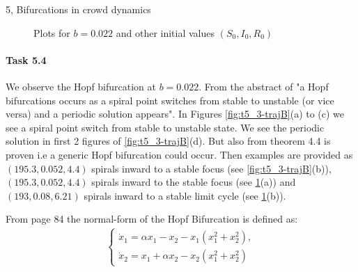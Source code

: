\begin{task}{5, Bifurcations in crowd dynamics}
\begin{figure}[H]
\centering
{}
\caption{Plots for $b=0.022$ and other initial values $(S_0, I_0, R_0 )$}
\label{fig:t5_3-sims}
\end{figure}

\newpage
\paragraph{Task 5.4}
We observe the Hopf bifurcation at $b=0.022$. From the abstract of \cite{rosales2004hopf} "a Hopf bifurcations occurs as a spiral point switches from stable to unstable (or vice versa) and a periodic solution appears". In Figures \ref{fig:t5_3-trajB}(a) to (c) we see a spiral point switch from stable to unstable state. We see the periodic solution in first 2 figures of \ref{fig:t5_3-trajB}(d). But also from \cite{shan2014bifurcations} theorem 4.4 is proven i.e a generic Hopf bifurcation could occur. Then examples are provided as $(195.3, 0.052, 4.4)$ spirals inward to a stable focus (see \ref{fig:t5_3-trajB}(b)), $(195.3, 0.052, 4.4)$ spirals inward to the stable focus (see \ref{fig:t5_3-sims}(a)) and $(193, 0.08, 6.21)$ spirals inward to a stable limit cycle (see \ref{fig:t5_3-sims}(b)).

From \cite{Kuznetsov1998} page 84 the normal-form of the Hopf Bifurcation is defined as:
\begin{align*}
    \begin{cases}
        \dot{x}_1 = \alpha x_1 - x_2 - x_1 (x_1^2 + x_2^2),\\
        \dot{x}_2 = x_1 + \alpha x_2 - x_2 (x_1^2 + x_2^2)
    \end{cases}
\end{align*}


\end{task}
